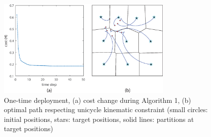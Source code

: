 \documentclass[journal]{IEEEtran}
\begin{document}
\begin{figure}
	\centering
	\includegraphics[width=3.4in]{figure/init_10_deploy_cmd}
	\caption{One-time deployment, (a) cost change during Algorithm 1, (b) optimal path respecting unicycle kinematic constraint (small circles: initial positions, stars: target positions, solid lines: partitions at target positions)}
	\label{fig:fig2}
\end{figure}
\end{document}
